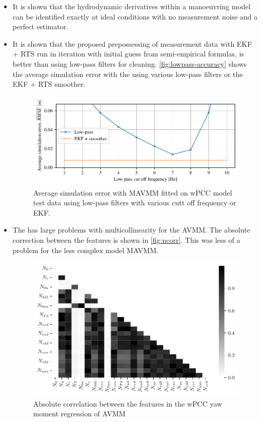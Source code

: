 \begin{itemize}
    
    \item It is shown that the hydrodynamic derivatives within a manoeuvring model can be identified exactly at ideal conditions with no measurement noise and a perfect estimator.
    
    \item It is shown that the proposed prepossessing of measurement data with EKF + RTS run in iteration with initial guess from semi-empirical formulas, is better than using low-pass filters for cleaning. \autoref{fig:lowpass-accuracy} shows the average simulation error with the  using various low-pass filters or the EKF + RTS smoother.
    \begin{figure}[h]
        \centering
        \includegraphics{kappa/images/6.pdf}
        \caption{Average simulation error with MAVMM fitted on wPCC model test data using low-pass filters with various cutt off frequency or EKF.}
        \label{fig:lowpass-accuracy}
    \end{figure}
    
    \item The  has large problems with multicollinearity for the AVMM. The absolute correction between the features is shown in \autoref{fig:ncorr}. This was less of a problem for the less complex model MAVMM.
    \begin{figure}[h]
        \centering
        \includegraphics{kappa/images/9.pdf}
        \caption{Absolute correlation between the features in the wPCC yaw moment regression of AVMM}
        \label{fig:ncorr}
    \end{figure}
    

\end{itemize}
